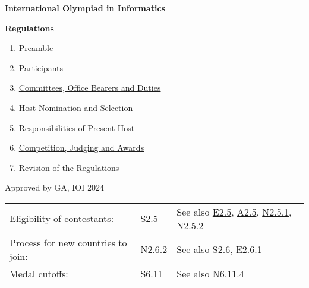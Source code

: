 \documentclass[12pt,a4paper]{article}
\begin{document}
\newcommand{\Statute}[2]{\item[S#1]\label{S#1} #2}
\newcommand{\Explication}[2]{\item[E#1]\label{E#1} #2}
\newcommand{\Appendix}[2]{\item[A#1]\label{A#1} #2}
\newcommand{\Note}[2]{\item[N#1]\label{N#1} \emph{#2}}
\newcommand{\Separator}[1]{\item[]\noindent\rule[4pt]{\linewidth}{0.4pt}}
\newcommand{\IOIn}[1][]{IOI\emph{'$n{#1}$}}
\newcommand{\Link}[1]{\hyperref[#1]{#1}}

\centerline{\huge \textbf{International Olympiad in Informatics}}
\vspace{1em}
\centerline{\huge \textbf{Regulations}}
\vspace{2em}
\begin{enumerate}
\item \hyperref[sec:1]{Preamble}
\item \hyperref[sec:2]{Participants}
\item \hyperref[sec:3]{Committees, Office Bearers and Duties}
\item \hyperref[sec:4]{Host Nomination and Selection}
\item \hyperref[sec:5]{Responsibilities of Present Host}
\item \hyperref[sec:6]{Competition, Judging and Awards}
\item \hyperref[sec:7]{Revision of the Regulations}
\end{enumerate}
\vspace{2em}
Approved by GA, IOI 2024

\vspace*{\fill}
\par
\vspace{1em}
\begin{tabular}{ l l l }
    Eligibility of contestants: & \Link{S2.5} & See also \Link{E2.5}, \Link{A2.5}, \Link{N2.5.1}, \Link{N2.5.2} \\
    Process for new countries to join: & \Link{N2.6.2} & See also \Link{S2.6}, \Link{E2.6.1} \\
    Medal cutoffs: & \Link{S6.11} & See also \Link{N6.11.4} \\
\end{tabular}

\newpage
\end{document}
